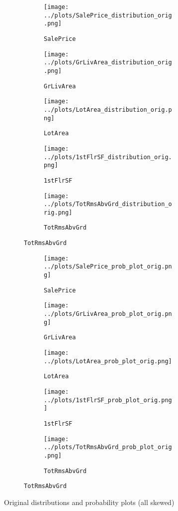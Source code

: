 \begin{figure}[h]
\begin{subfigure}{\textwidth}
    \centering
    \begin{subfigure}{.19\textwidth}
        \texttt{[image: ../plots/SalePrice\_distribution\_orig.png]}
        \caption{\texttt{SalePrice}}
    \end{subfigure}
    \begin{subfigure}{.19\textwidth}
        \texttt{[image: ../plots/GrLivArea\_distribution\_orig.png]}
        \caption{\texttt{GrLivArea}}
    \end{subfigure}
    \begin{subfigure}{.19\textwidth}
        \texttt{[image: ../plots/LotArea\_distribution\_orig.png]}
        \caption{\texttt{LotArea}}
    \end{subfigure}
    \begin{subfigure}{.19\textwidth}
        \texttt{[image: ../plots/1stFlrSF\_distribution\_orig.png]}
        \caption{\texttt{1stFlrSF}}
    \end{subfigure}
    \begin{subfigure}{.19\textwidth}
        \texttt{[image: ../plots/TotRmsAbvGrd\_distribution\_orig.png]}
        \caption{\texttt{TotRmsAbvGrd}}
    \end{subfigure}
\end{subfigure}
\begin{subfigure}{\textwidth}
    \centering
    \begin{subfigure}{.19\textwidth}
        \texttt{[image: ../plots/SalePrice\_prob\_plot\_orig.png]}
        \caption{\texttt{SalePrice}}
    \end{subfigure}
    \begin{subfigure}{.19\textwidth}
        \texttt{[image: ../plots/GrLivArea\_prob\_plot\_orig.png]}
        \caption{\texttt{GrLivArea}}
    \end{subfigure}
    \begin{subfigure}{.19\textwidth}
        \texttt{[image: ../plots/LotArea\_prob\_plot\_orig.png]}
        \caption{\texttt{LotArea}}
    \end{subfigure}
    \begin{subfigure}{.19\textwidth}
        \texttt{[image: ../plots/1stFlrSF\_prob\_plot\_orig.png]}
        \caption{\texttt{1stFlrSF}}
    \end{subfigure}
    \begin{subfigure}{.19\textwidth}
        \texttt{[image: ../plots/TotRmsAbvGrd\_prob\_plot\_orig.png]}
        \caption{\texttt{TotRmsAbvGrd}}
    \end{subfigure}
\end{subfigure}
\caption{Original distributions and probability plots (all skewed)}
\label{fig:features_orig}
\end{figure}

